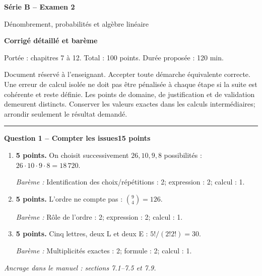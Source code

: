 \documentclass[11pt,a4paper]{article}
\begin{document}
{\LARGE\bfseries Série B -- Examen 2}\par
{\large Dénombrement, probabilités et algèbre linéaire}\par
\textbf{Corrigé détaillé et barème}\par
Portée : chapitres 7 à 12. Total : 100 points. Durée proposée : 120 min.\par
\small Document réservé à l’enseignant. Accepter toute démarche équivalente correcte. Une erreur de calcul isolée ne doit pas être pénalisée à chaque étape si la suite est cohérente et reste définie. Les points de domaine, de justification et de validation demeurent distincts. Conserver les valeurs exactes dans les calculs intermédiaires; arrondir seulement le résultat demandé.\normalsize\par
\vspace{3mm}\hrule\vspace{4mm}
{\large\bfseries Question 1 -- Compter les issues}\hfill\textbf{15 points}\par
\begin{enumerate}
\item \textbf{5 points.} On choisit successivement \(26,10,9,8\) possibilités : \(26\cdot10\cdot9\cdot8=18\,720\).
\par{\small\textit{Barème : }Identification des choix/répétitions : 2; expression : 2; calcul : 1.}
\item \textbf{5 points.} L’ordre ne compte pas : \(\binom94=126\).
\par{\small\textit{Barème : }Rôle de l’ordre : 2; expression : 2; calcul : 1.}
\item \textbf{5 points.} Cinq lettres, deux L et deux E : \(5!/(2!2!)=30\).
\par{\small\textit{Barème : }Multiplicités exactes : 2; formule : 2; calcul : 1.}
\end{enumerate}
\vfill {\small\textit{Ancrage dans le manuel : sections 7.1--7.5 et 7.9.}}
\end{document}
